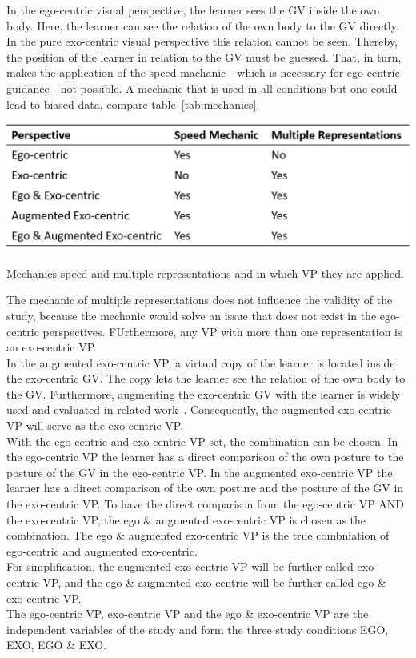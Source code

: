 In the ego-centric visual perspective, the learner sees the GV inside the own body. Here, the learner can see the relation of the own body to the GV directly. In the pure exo-centric visual perspective this relation cannot be seen. Thereby, the position of the learner in relation to the GV must be guessed. That, in turn, makes the application of the speed machanic - which is necessary for ego-centric guidance - not possible. A mechanic that is used in all conditions but one could lead to biased data, compare table~\ref{tab:mechanics}.
\begin{table}[htb]
	\centering
	\includegraphics[width=\textwidth]{figures/mechanics_comparison.png}
	\caption[Mechanics for Motor Learing in Virtual Reality]{Mechanics speed and multiple representations and in which VP they are applied.}
	\label{tab:mechanics}
\end{table}
The mechanic of multiple representations does not influence the validity of the study, because the mechanic would solve an issue that does not exist in the ego-centric perspectives. FUrthermore, any VP  with more than one representation is an exo-centric VP.\\
In the augmented exo-centric VP, a virtual copy of the learner is located inside the exo-centric GV. The copy lets the learner see the relation of the own body to the GV. Furthermore, augmenting the exo-centric GV with the learner is widely used and evaluated in related work~\cite{YouMove,thaichichua}. Consequently, the augmented exo-centric VP will serve as the exo-centric VP.\\
With the ego-centric and exo-centric VP set, the combination can be chosen. In the ego-centric VP the learner has a direct comparison of the own posture to the posture of the GV in the ego-centric VP. In the augmented exo-centric VP the learner has a direct comparison of the own posture and the posture of the GV in the exo-centric VP. To have the direct comparison from the ego-centric VP AND the exo-centric VP, the ego \& augmented exo-centric VP is chosen as the combination. The ego \& augmented exo-centric VP is the true combniation of ego-centric and augmented exo-centric.\\
For simplification, the augmented exo-centric VP will be further called exo-centric VP, and the ego \& augmented exo-centric will be further called ego \& exo-centric VP.\\
The ego-centric VP, exo-centric VP and the ego \& exo-centric VP are the independent variables of the study and form the three study conditions EGO, EXO, EGO \& EXO.

